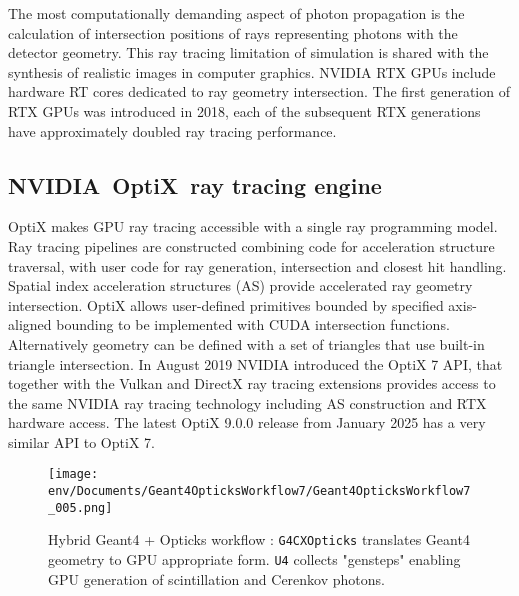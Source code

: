 \documentclass{webofc}
\begin{document}
The most computationally demanding aspect of photon propagation
is the calculation of intersection positions of rays representing photons with the detector geometry.
This ray tracing limitation of simulation is shared with the synthesis of realistic images in computer graphics. 
NVIDIA RTX\cite{rtx} GPUs include hardware RT cores dedicated to ray geometry intersection. 
The first generation of RTX GPUs was introduced in 2018, each of the subsequent RTX generations have 
approximately doubled ray tracing performance.  
%
%
\subsection{NVIDIA\textregistered\ OptiX\texttrademark\ ray tracing engine}
%
OptiX\cite{optix} makes GPU ray tracing accessible with a single ray programming model.
Ray tracing pipelines are constructed combining code for acceleration structure traversal, 
with user code for ray generation, intersection and closest hit handling.
Spatial index acceleration structures (AS) provide accelerated ray geometry intersection. 
%
OptiX allows user-defined primitives bounded by specified axis-aligned bounding
to be implemented with CUDA intersection functions. Alternatively geometry can be 
defined with a set of triangles that use built-in triangle intersection.  
%
In August 2019 NVIDIA introduced the OptiX 7 API,
that together with the Vulkan and DirectX ray tracing extensions provides access 
to the same NVIDIA ray tracing technology including AS construction and RTX hardware access. 
The latest OptiX 9.0.0 release from January 2025 has a very similar API to OptiX 7.   
%
%
\begin{figure}[t]
\centering
\texttt{[image: env/Documents/Geant4OpticksWorkflow7/Geant4OpticksWorkflow7\_005.png]}
\caption{Hybrid Geant4 + Opticks workflow : {\tt G4CXOpticks} translates Geant4 geometry to GPU appropriate form. 
{\tt U4} collects "gensteps" enabling GPU generation of scintillation and Cerenkov photons.
}
\label{workflow} 
\vspace{-5mm}
\end{figure}
%
\end{document}
